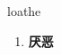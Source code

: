 
\begin{frame}
{\huge loathe}
\begin{center}
\begin{enumerate}\Large
  \item \textbf{厌恶}
\end{enumerate}
\end{center}
\end{frame}
